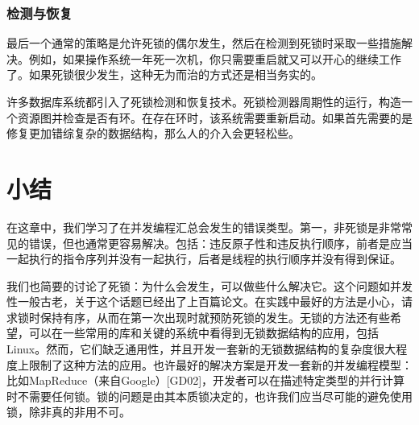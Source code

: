 \subsubsection*{检测与恢复}
最后一个通常的策略是允许死锁的偶尔发生，然后在检测到死锁时采取一些措施解决。例如，如果操作系统一年死一次机，你只需要重启就又可以开心的继续工作了。如果死锁很少发生，这种无为而治的方式还是相当务实的。

许多数据库系统都引入了死锁检测和恢复技术。死锁检测器周期性的运行，构造一个资源图并检查是否有环。在存在环时，该系统需要重新启动。如果首先需要的是修复更加错综复杂的数据结构，那么人的介入会更轻松些。



\section{小结}
在这章中，我们学习了在并发编程汇总会发生的错误类型。第一，非死锁是非常常见的错误，但也通常更容易解决。包括：违反原子性和违反执行顺序，前者是应当一起执行的指令序列并没有一起执行，后者是线程的执行顺序并没有得到保证。

我们也简要的讨论了死锁：为什么会发生，可以做些什么解决它。这个问题如并发性一般古老，关于这个话题已经出了上百篇论文。在实践中最好的方法是小心，请求锁时保持有序，从而在第一次出现时就预防死锁的发生。无锁的方法还有些希望，可以在一些常用的库和关键的系统中看得到无锁数据结构的应用，包括Linux。然而，它们缺乏通用性，并且开发一套新的无锁数据结构的复杂度很大程度上限制了这种方法的应用。也许最好的解决方案是开发一套新的并发编程模型：比如MapReduce（来自Google）[GD02]，开发者可以在描述特定类型的并行计算时不需要任何锁。锁的问题是由其本质锁决定的，也许我们应当尽可能的避免使用锁，除非真的非用不可。






